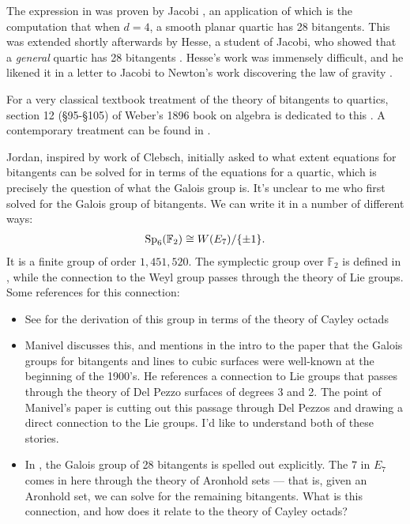 \documentclass[11pt]{amsart}
\begin{document}
The expression in  was proven by Jacobi \cite{Jacobi1850}, an application of which is the computation that when $d=4$, a smooth planar quartic has 28 bitangents. This was extended shortly afterwards by Hesse, a student of Jacobi, who showed that a \textit{general} quartic has 28 bitangents \cite{Hesse1855}. Hesse's work was immensely difficult, and he likened it in a letter to Jacobi to Newton's work discovering the law of gravity \cite[p.~165]{Gray-worlds}.

For a very classical textbook treatment of the theory of bitangents to quartics, section 12 (\S95-\S105) of Weber's 1896 book on algebra is dedicated to this \cite[\S95-\S105]{Weber1896}. A contemporary treatment can be found in \cite[\S6.1]{Dolgachev}.

Jordan, inspired by work of Clebsch, initially asked to what extent equations for bitangents can be solved for in terms of the equations for a quartic, which is precisely the question of what the Galois group is. It's unclear to me who first solved for the Galois group of bitangents. We can write it in a number of different ways:
\begin{align*}
    \mathrm{Sp}_6(\mathbb{F}_2) \cong W(E_7)/\{\pm 1\}.
\end{align*}
It is a finite group of order $1,451,520$. The symplectic group over $\mathbb{F}_2$ is defined in , while the connection to the Weyl group passes through the theory of Lie groups. Some references for this connection:
\begin{itemize}
    \item See \cite[Theorem~9]{DolgachevOrtland} for the derivation of this group in terms of the theory of Cayley octads
    \item Manivel \cite{Manivel2006} discusses this, and mentions in the intro to the paper that the Galois groups for bitangents and lines to cubic surfaces were well-known at the beginning of the 1900's. He references a connection to Lie groups that passes through the theory of Del Pezzo surfaces of degrees 3 and 2. The point of Manivel's paper is cutting out this passage through Del Pezzos and drawing a direct connection to the Lie groups. I'd like to understand both of these stories.
    \item In \cite[p.~367]{MillerBlichfeldtDickson}, the Galois group of 28 bitangents is spelled out explicitly. The $7$ in $E_7$ comes in here through the theory of Aronhold sets --- that is, given an Aronhold set, we can solve for the remaining bitangents. What is this connection, and how does it relate to the theory of Cayley octads?
\end{itemize}
\end{document}
